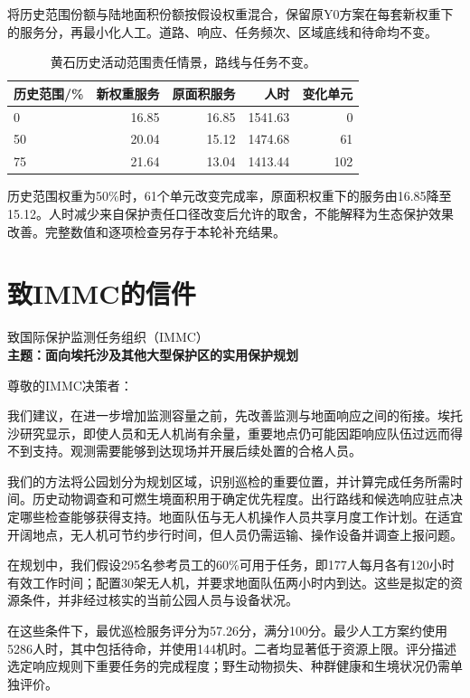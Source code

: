 \documentclass[12pt,a4paper]{article}
\numberwithin{equation}{section}
\begin{document}
将历史范围份额与陆地面积份额按假设权重混合，保留原Y0方案在每套新权重下的服务分，再最小化人工。道路、响应、任务频次、区域底线和待命均不变。

\begin{table}[!htbp]
\centering\normalsize
\caption{黄石历史活动范围责任情景，路线与任务不变。}
\label{tab:wolf}
\begin{tabular}{lrrrr}
\toprule
历史范围/\% & 新权重服务 & 原面积服务 & 人时 & 变化单元 \\
\midrule
0 & 16.85 & 16.85 & 1541.63 & 0 \\
50 & 20.04 & 15.12 & 1474.68 & 61 \\
75 & 21.64 & 13.04 & 1413.44 & 102 \\
\bottomrule
\end{tabular}
\end{table}

历史范围权重为50\%时，61个单元改变完成率，原面积权重下的服务由16.85降至15.12。人时减少来自保护责任口径改变后允许的取舍，不能解释为生态保护效果改善。完整数值和逐项检查另存于本轮补充结果。

\clearpage

\section*{致IMMC的信件}
\noindent 致国际保护监测任务组织（IMMC）\\
\textbf{主题：面向埃托沙及其他大型保护区的实用保护规划}

尊敬的IMMC决策者：

我们建议，在进一步增加监测容量之前，先改善监测与地面响应之间的衔接。埃托沙研究显示，即使人员和无人机尚有余量，重要地点仍可能因距响应队伍过远而得不到支持。观测需要能够到达现场并开展后续处置的合格人员。

我们的方法将公园划分为规划区域，识别巡检的重要位置，并计算完成任务所需时间。历史动物调查和可燃生境面积用于确定优先程度。出行路线和候选响应驻点决定哪些检查能够获得支持。地面队伍与无人机操作人员共享月度工作计划。在适宜开阔地点，无人机可节约步行时间，但人员仍需运输、操作设备并调查上报问题。

在规划中，我们假设295名参考员工的60\%可用于任务，即177人每月各有120小时有效工作时间；配置30架无人机，并要求地面队伍两小时内到达。这些是拟定的资源条件，并非经过核实的当前公园人员与设备状况。

在这些条件下，最优巡检服务评分为57.26分，满分100分。最少人工方案约使用5286人时，其中包括待命，并使用144机时。二者均显著低于资源上限。评分描述选定响应规则下重要任务的完成程度；野生动物损失、种群健康和生境状况仍需单独评价。
\end{document}
